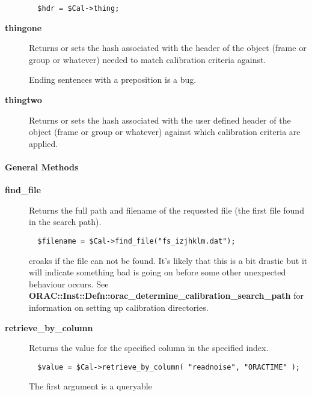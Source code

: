 \begin{description}
\begin{verbatim}
  $hdr = $Cal->thing;
\end{verbatim}

\item[{\textbf{thingone}}] \mbox{}

Returns or sets the hash associated with the header of the object
(frame or group or whatever) needed to match calibration criteria
against.



Ending sentences with a preposition is a bug.


\item[{\textbf{thingtwo}}] \mbox{}

Returns or sets the hash associated with the user defined header of
the object (frame or group or whatever) against which calibration
criteria are applied.

\end{description}
\paragraph*{General Methods\label{ORAC::Calib_General_Methods}}
\begin{description}

\item[{\textbf{find\_file}}] \mbox{}

Returns the full path and filename of the requested file (the first
file found in the search path).

\begin{verbatim}
  $filename = $Cal->find_file("fs_izjhklm.dat");
\end{verbatim}


croaks if the file can not be found. It's likely that this is a bit
drastic but it will indicate something bad is going on before some
other unexpected behaviour occurs.  See
\textbf{ORAC::Inst::Defn::orac\_determine\_calibration\_search\_path} for
information on setting up calibration directories.


\item[{\textbf{retrieve\_by\_column}}] \mbox{}

Returns the value for the specified column in the specified index.

\begin{verbatim}
  $value = $Cal->retrieve_by_column( "readnoise", "ORACTIME" );
\end{verbatim}


The first argument is a queryable

\end{description}
